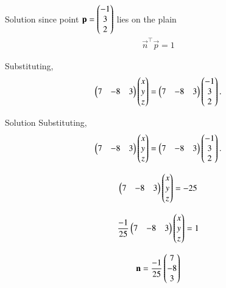 \documentclass{beamer}
\begin{document}
\begin{frame}{Solution}
    since point $\mathbf{p}=\begin{pmatrix}-1 \\ 3 \\ 2\end{pmatrix}$ lies on the plain
\begin{align}
    \vec{n}^\top\vec{p}=1
\end{align}

Substituting,
\begin{align}
\begin{pmatrix}7 & -8 & 3\end{pmatrix}
\begin{pmatrix}x \\ y \\ z\end{pmatrix}
=
\begin{pmatrix}7 & -8 & 3\end{pmatrix}\begin{pmatrix}-1 \\ 3 \\ 2\end{pmatrix}.
\end{align}
\end{frame}

\begin{frame}{Solution}
    Substituting,
\begin{align}
\begin{pmatrix}7 & -8 & 3\end{pmatrix}
\begin{pmatrix}x \\ y \\ z\end{pmatrix}
=
\begin{pmatrix}7 & -8 & 3\end{pmatrix}\begin{pmatrix}-1 \\ 3 \\ 2\end{pmatrix}.
\end{align}

\begin{align}
\begin{pmatrix}7 & -8 & 3\end{pmatrix}
\begin{pmatrix}x \\ y \\ z\end{pmatrix}
= -25
\end{align}

\begin{align}
\frac{-1}{25}\begin{pmatrix}7 & -8 & 3\end{pmatrix}
\begin{pmatrix}x \\ y \\ z\end{pmatrix}
=1 
\end{align}

\begin{align}
\mathbf{n}=\frac{-1}{25}\begin{pmatrix}7 \\ -8 \\ 3\end{pmatrix}
\end{align}
\end{frame}
\end{document}
